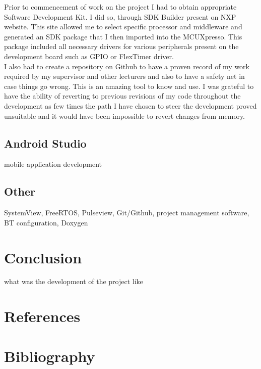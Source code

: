 \documentclass[12pt,a4paper]{article}
\begin{document}
		Prior to commencement of work on the project I had to obtain appropriate Software
		Development Kit. I did so, through SDK Builder present on NXP website. This site allowed 
		me to select specific processor and middleware and generated an SDK package that I then 
		imported into the MCUXpresso. This package included all necessary drivers for various 
		peripherals present on the development board such as GPIO or FlexTimer driver.\\
		
		I also had to create a repository on Github to have a proven record of my work required 
		by my supervisor and other lecturers and also to have a safety net in case things go 
		wrong. This is an amazing tool to know and use. I was grateful to have the ability of 
		reverting to previous revisions of my code throughout the development as few times the  
		path I have chosen to steer the development proved unsuitable and it would have been  
		impossible to revert changes from memory.\\
		    
		\newpage
	
		\subsection{Android Studio}
		mobile application development
		\newpage
		
		\subsection{Other}
		SystemView, FreeRTOS, Pulseview, Git/Github, project management software, BT configuration,
		Doxygen
		\newpage
	
	\section{Conclusion}
	what was the development of the project like
	\newpage
	
	\section{References}
	\newpage
	
	\section{Bibliography}
	\newpage
	
	\listoffigures
	
\end{document}
